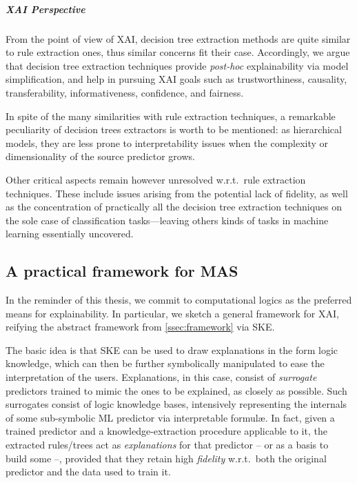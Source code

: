 \documentclass[12pt,a4paper,openright,twoside]{book}
\begin{document}
\subparagraph{XAI Perspective}

From the point of view of XAI, decision tree extraction methods are quite similar to rule extraction ones, thus similar concerns fit their case.
%
Accordingly, we argue that decision tree extraction techniques provide \emph{post-hoc} explainability via model simplification, and help in pursuing XAI goals such as trustworthiness, causality, transferability, informativeness, confidence, and fairness.

In spite of the many similarities with rule extraction techniques, a remarkable peculiarity of decision trees extractors is worth to be mentioned: as hierarchical models, they are less prone to interpretability issues when the complexity or dimensionality of the source predictor grows.

Other critical aspects remain however unresolved w.r.t.\ rule extraction techniques.
%
These include issues arising from the potential lack of fidelity, as well as the concentration of practically all the decision tree extraction techniques on the sole case of classification tasks---leaving others kinds of tasks in machine learning essentially uncovered.



\subsection{A practical framework for MAS}


In the reminder of this thesis, we commit to computational logics as the preferred means for explainability.
%
In particular, we sketch a general framework for XAI, reifying the abstract framework from \cref{ssec:framework} via SKE.

The basic idea is that SKE can be used to draw explanations in the form logic knowledge, which can then be further symbolically manipulated to ease the interpretation of the users.
%
Explanations, in this case, consist of \emph{surrogate} predictors trained to mimic the ones to be explained, as closely as possible.
%
Such surrogates consist of logic knowledge bases, intensively representing the internals of some sub-symbolic ML predictor via interpretable formul\ae{}.
%
In fact, given a trained predictor and a knowledge-extraction procedure applicable to it, the extracted rules/trees act as \emph{explanations} for that predictor -- or as a basis to build some --, provided that they retain high \emph{fidelity} w.r.t.\ both the original predictor and the data used to train it.
\end{document}
